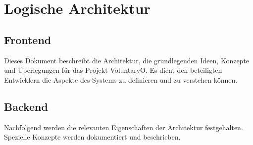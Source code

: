 \chapter{Logische Architektur}
	\section{Frontend}
	Dieses Dokument beschreibt die Architektur, die grundlegenden Ideen, Konzepte und Überlegungen für das Projekt VoluntaryO. Es dient den beteiligten Entwicklern die Aspekte des Systems zu definieren und zu verstehen können.
	
	
	\section{Backend}
	Nachfolgend werden die relevanten Eigenschaften der Architektur festgehalten. Spezielle Konzepte werden dokumentiert und beschrieben.